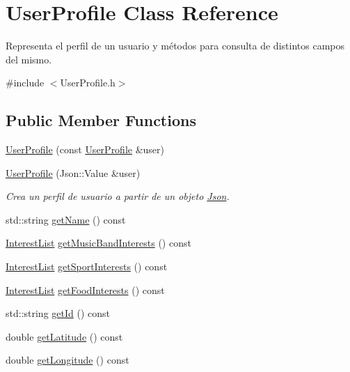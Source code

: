 \hypertarget{class_user_profile}{}\section{User\+Profile Class Reference}
\label{class_user_profile}


Representa el perfil de un usuario y métodos para consulta de distintos campos del mismo.  




{\ttfamily \#include $<$User\+Profile.\+h$>$}

\subsection*{Public Member Functions}
\begin{DoxyCompactItemize}
\item 
\hyperlink{class_user_profile_ab76951c7e88e70c50013705fcfacfbba}{User\+Profile} (const \hyperlink{class_user_profile}{User\+Profile} \&user)
\item 
\hyperlink{class_user_profile_adce414cd8095dd3613d6b0c2ee9d7222}{User\+Profile} (Json\+::\+Value \&user)
\begin{DoxyCompactList}\small\item\em Crea un perfil de usuario a partir de un objeto \hyperlink{namespace_json}{Json}. \end{DoxyCompactList}\item 
std\+::string \hyperlink{class_user_profile_a822835419b623e643362ba3d1eb73651}{get\+Name} () const 
\item 
\hyperlink{_user_profile_8h_a760a9aa8b4a0e703ef8f23404e88b06c}{Interest\+List} \hyperlink{class_user_profile_a883804f04b7aae98d6c609a0bde8c7a3}{get\+Music\+Band\+Interests} () const 
\item 
\hyperlink{_user_profile_8h_a760a9aa8b4a0e703ef8f23404e88b06c}{Interest\+List} \hyperlink{class_user_profile_a502ce9c46cb22ed131f547ab4c1dbcac}{get\+Sport\+Interests} () const 
\item 
\hyperlink{_user_profile_8h_a760a9aa8b4a0e703ef8f23404e88b06c}{Interest\+List} \hyperlink{class_user_profile_a4cc3b5c10b0bb24478f2ceecb7e1c965}{get\+Food\+Interests} () const 
\item 
std\+::string \hyperlink{class_user_profile_ab8957cb38de37ba628a75745c13df4b7}{get\+Id} () const 
\item 
double \hyperlink{class_user_profile_a3663e006f1044dffc943f31861f56550}{get\+Latitude} () const 
\item 
double \hyperlink{class_user_profile_aa804f7c9381824b398b4eff9fa716313}{get\+Longitude} () const 
\end{DoxyCompactItemize}



